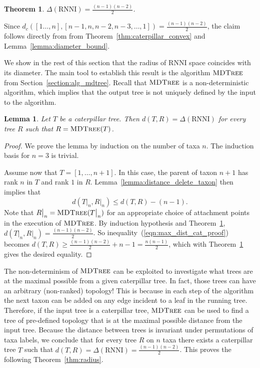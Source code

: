 \documentclass{amsart}
\newcommand{\rnni}{\mathrm{RNNI}}
\newcommand{\mdtree}{\textsc{MDTree}}
\newtheorem{theorem}[definition]{Theorem}
\newtheorem{lemma}[definition]{Lemma}
\begin{document}
\begin{theorem}
$\Delta(\rnni) = \frac{(n-1)(n-2)}{2}$.
\label{thm:diameter}
\end{theorem}

\proof
Since $d_c([1\ldots,n], [n-1,n,n-2,n-3, \ldots, 1]) = \frac{(n-1)(n-2)}{2}$, the claim follows directly from from Theorem~\ref{thm:caterpillar_convex} and Lemma~\ref{lemma:diameter_bound}.
\endproof

We show in the rest of this section that the radius of $\rnni$ space coincides with its diameter.
The main tool to establish this result is the algorithm $\mdtree$ from Section~\ref{section:alg_mdtree}.
Recall that $\mdtree$ is a non-deterministic algorithm, which implies that the output tree is not uniquely defined by the input to the algorithm.

\begin{lemma}
Let $T$ be a caterpillar tree.
Then $d(T, R) = \Delta(\rnni)$ for every tree $R$ such that $R = \mdtree(T)$.
\label{lemma:max_dist_caterpillar}
\end{lemma}

\begin{proof}
We prove the lemma by induction on the number of taxa $n$.
The induction basis for $n = 3$ is trivial.

Assume now that $T = [1, \ldots, n+1]$.
In this case, the parent of taxon $n+1$ has rank $n$ in $T$ and rank $1$ in $R$.
Lemma~\ref{lemma:distance_delete_taxon} then implies that
\begin{equation}
d(T\big|_n,R\big|_n) \leq d(T,R) - (n-1).
\label{eqn:max_dist_cat_proof}
\end{equation}
Note that $R\big|_n = \mdtree (T\big|_n)$ for an appropriate choice of attachment points in the execution of $\mdtree$.
By induction hypothesis and Theorem~\ref{thm:diameter}, $d(T\big|_n,R\big|_n) = \frac{(n-1)(n-2)}{2}$.
So inequality~(\ref{eqn:max_dist_cat_proof}) becomes $d(T,R) \geq \frac{(n-1)(n-2)}{2} + n - 1 = \frac{n(n-1)}{2}$, which with Theorem~\ref{thm:diameter} gives the desired equality.
\end{proof}

The non-determinism of $\mdtree$ can be exploited to investigate what trees are at the maximal possible from a given caterpillar tree.
In fact, those trees can have an arbitrary (non-ranked) topology!
This is because in each step of the algorithm the next taxon can be added on any edge incident to a leaf in the running tree.
Therefore, if the input tree is a caterpillar tree, $\mdtree$ can be used to find a tree of pre-defined topology that is at the maximal possible distance from the input tree.
Because the distance between trees is invariant under permutations of taxa labels, we conclude that for every tree $R$ on $n$ taxa there exists a caterpillar tree $T$ such that $d(T,R) = \Delta(\rnni) = \frac{(n-1)(n-2)}{2}$.
This proves the following Theorem~\ref{thm:radius}.
\end{document}
